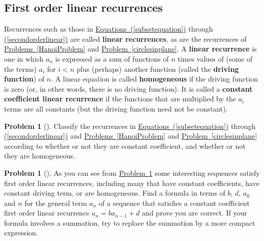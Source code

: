 \documentclass[10pt,]{book}
\newcommand{\terminology}[1]{\textbf{#1}}
\theoremstyle{plain}
\theoremstyle{definition}
\newtheorem{activity}[project]{Problem}
\theoremstyle{definition}
\numberwithin{equation}{chapter}
\newcommand{\lt}{<}
\begin{document}
\subsection[{First order linear recurrences}]{First order linear recurrences}\label{subsection-19}
Recurrences such as those in \hyperref[subsetequation]{Equations~(\ref{subsetequation})} through \hyperref[secondorderlinear]{(\ref{secondorderlinear})} are called \terminology{linear recurrences}, as are the recurrences of \hyperref[HanoiProblem]{Problems~\ref{HanoiProblem}} and \hyperref[circlesinplane]{Problem~\ref{circlesinplane}}. A \terminology{linear recurrence} is one in which \(a_n\) is expressed as a sum of functions of \(n\) times values of (some of the terms) \(a_i\) for \(i\lt n\) plus (perhaps) another function (called the \terminology{driving function}) of \(n\). A linear equation is called \terminology{homogeneous} if the driving function is zero (or, in other words, there is no driving function). It is called a \terminology{constant coefficient linear recurrence} if the functions that are multiplied by the \(a_i\) terms are all constants (but the driving function need not be constant).%
\begin{activity}[]\marginsymbol[-1em]{} \label{classifyrecurrences}
Classify the recurrences in \hyperref[subsetequation]{Equations~(\ref{subsetequation})} through \hyperref[secondorderlinear]{(\ref{secondorderlinear})} and \hyperref[HanoiProblem]{Problems~\ref{HanoiProblem}} and \hyperref[circlesinplane]{Problem~\ref{circlesinplane}} according to whether or not they are constant coefficient, and whether or not they are homogeneous.%
\end{activity}
\begin{activity}[] \label{firstordlinconst}
As you can see from \hyperref[classifyrecurrences]{Problem~\ref{classifyrecurrences}} some interesting sequences satisfy first order linear recurrences, including many that have constant coefficients, have constant driving term, or are homogeneous. Find a formula in terms of \(b\), \(d\), \(a_0\) and \(n\) for the general term \(a_n\) of a sequence that satisfies a constant coefficient first order linear recurrence \(a_n = ba_{n-1} + d\) and prove you are correct. If your formula involves a summation, try to replace the summation by a more compact expression.%
\end{activity}
\typeout{************************************************}
\typeout{************************************************}
\end{document}

